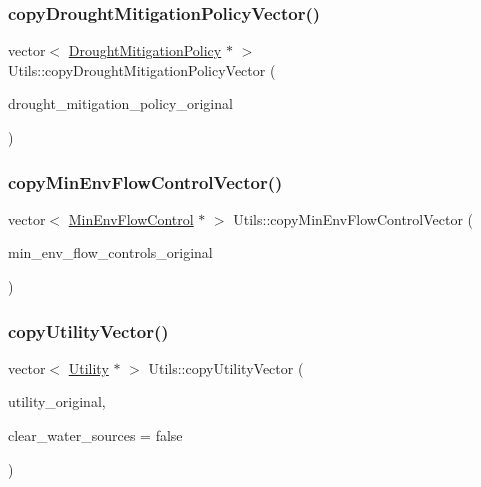 \subsubsection{\texorpdfstring{copy\+Drought\+Mitigation\+Policy\+Vector()}{copyDroughtMitigationPolicyVector()}}
{\footnotesize\ttfamily vector$<$ \mbox{\hyperlink{classDroughtMitigationPolicy}{Drought\+Mitigation\+Policy}} $\ast$ $>$ Utils\+::copy\+Drought\+Mitigation\+Policy\+Vector (\begin{DoxyParamCaption}\item[{vector$<$ \mbox{\hyperlink{classDroughtMitigationPolicy}{Drought\+Mitigation\+Policy}} $\ast$$>$}]{drought\+\_\+mitigation\+\_\+policy\+\_\+original }\end{DoxyParamCaption})\hspace{0.3cm}{\ttfamily [static]}}

\mbox{\label{classUtils_af0041ddac14b680b4039e378b060b6f7}} 
\subsubsection{\texorpdfstring{copy\+Min\+Env\+Flow\+Control\+Vector()}{copyMinEnvFlowControlVector()}}
{\footnotesize\ttfamily vector$<$ \mbox{\hyperlink{classMinEnvFlowControl}{Min\+Env\+Flow\+Control}} $\ast$ $>$ Utils\+::copy\+Min\+Env\+Flow\+Control\+Vector (\begin{DoxyParamCaption}\item[{vector$<$ \mbox{\hyperlink{classMinEnvFlowControl}{Min\+Env\+Flow\+Control}} $\ast$$>$}]{min\+\_\+env\+\_\+flow\+\_\+controls\+\_\+original }\end{DoxyParamCaption})\hspace{0.3cm}{\ttfamily [static]}}

\mbox{\label{classUtils_aae13775d0c17ca43ae39450188958d7d}} 
\subsubsection{\texorpdfstring{copy\+Utility\+Vector()}{copyUtilityVector()}}
{\footnotesize\ttfamily vector$<$ \mbox{\hyperlink{classUtility}{Utility}} $\ast$ $>$ Utils\+::copy\+Utility\+Vector (\begin{DoxyParamCaption}\item[{vector$<$ \mbox{\hyperlink{classUtility}{Utility}} $\ast$$>$}]{utility\+\_\+original,  }\item[{bool}]{clear\+\_\+water\+\_\+sources = {\ttfamily false} }\end{DoxyParamCaption})\hspace{0.3cm}{\ttfamily [static]}}

